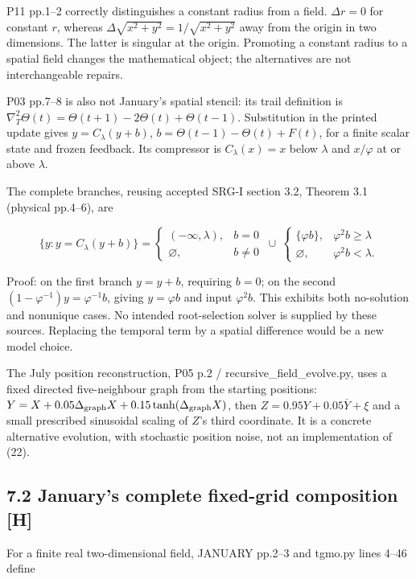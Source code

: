 \documentclass[11pt,a4paper]{article}
\begin{document}
P11 pp.1--2 correctly distinguishes a constant radius from a field. $\Delta r=0$ for constant $r$, whereas $\Delta\sqrt{x^2+y^2}=1/\sqrt{x^2+y^2}$ away from the origin in two dimensions. The latter is singular at the origin. Promoting a constant radius to a spatial field changes the mathematical object; the alternatives are not interchangeable repairs.


P03 pp.7--8 is also not January's spatial stencil: its trail definition is
$\nabla_T^2\Theta(t)=\Theta(t+1)-2\Theta(t)+\Theta(t-1)$.
Substitution in the printed update gives
$y=C_\lambda(y+b)$, $b=\Theta(t-1)-\Theta(t)+F(t)$, for a finite scalar state and frozen feedback. Its compressor is $C_\lambda(x)=x$ below $\lambda$ and $x/\varphi$ at or above $\lambda$.


The complete branches, reusing accepted SRG-I section 3.2, Theorem 3.1 (physical pp.4--6), are


\[
\{y:y=C_\lambda(y+b)\}
=\begin{cases}(-\infty,\lambda),&b=0\\\varnothing,&b\ne0\end{cases}
\ \cup\
\begin{cases}\{\varphi b\},&\varphi^2b\geq\lambda\\\varnothing,&\varphi^2b<\lambda.\end{cases} \tag{22}
\]

Proof: on the first branch $y=y+b$, requiring $b=0$; on the second $(1-\varphi^{-1})y=\varphi^{-1}b$, giving $y=\varphi b$ and input $\varphi^2b$. This exhibits both no-solution and nonunique cases. No intended root-selection solver is supplied by these sources. Replacing the temporal term by a spatial difference would be a new model choice.


The July position reconstruction, P05 p.2 / recursive\_\allowbreak{}field\_\allowbreak{}evolve.py, uses a fixed directed five-neighbour graph from the starting positions:
$Y=X+0.05\Delta_{\rm graph}X+0.15\tanh(\Delta_{\rm graph}X)$,
then $Z=0.95Y+0.05\overline Y+\xi$ and a small prescribed sinusoidal scaling of $Z$'s third coordinate. It is a concrete alternative evolution, with stochastic position noise, not an implementation of (22).


\subsection*{7.2 January's complete fixed-grid composition [H]}

For a finite real two-dimensional field, JANUARY pp.2--3 and tgmo.py lines 4--46 define
\end{document}
